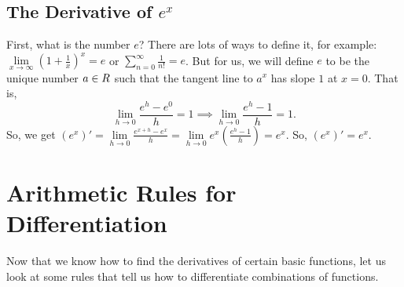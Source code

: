 \subsection{The Derivative of $ e^x $}
First, what is the number $ e $? There are lots of ways to define it, for example:
$ \lim\limits_{{x} \to {\infty}}(1+\frac{1}{x})^{x}=e $ or $ \sum_{n=0}^{\infty}\frac{1}{n!}=e $.
But for us, we will define $ e $ to be the unique number $ a\in\relax{R} $ such that the tangent line to $ a^x $
has slope $ 1 $ at $ x=0 $. That is,
\[ \lim\limits_{{h} \to {0}}\frac{e^h-e^0}{h}=1\implies \lim\limits_{{h} \to {0}}\frac{e^h-1}{h}=1. \]
So, we get $ (e^x)'=\lim\limits_{{h} \to {0}}\frac{e^{x+h}-e^x}{h}=\lim\limits_{{h} \to {0}}e^x(\frac{e^h-1}{h})=e^x $.
So, $ (e^x)'=e^x $.

\setcounter{section}{6}
\section{Arithmetic Rules for Differentiation}
Now that we know how to find the derivatives of certain basic functions,
let us look at some rules that tell us how to differentiate combinations
of functions.
